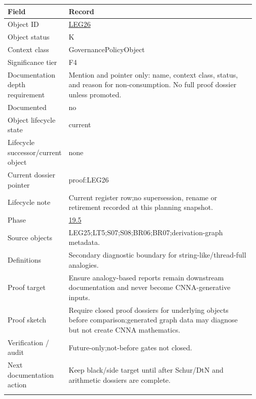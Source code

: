 \begin{longtable}{L{0.16\linewidth} L{0.81\linewidth}}
\hline
\textbf{Field} & \textbf{Record}\\
\hline
Object ID & \hyperlink{object-row-LEG26}{LEG26}\\
\hline\addlinespace[0.20em]
Object status & K\\
\hline\addlinespace[0.20em]
Context class & GovernancePolicyObject\\
\hline\addlinespace[0.20em]
Significance tier & F4\\
\hline\addlinespace[0.20em]
Documentation depth requirement & Mention and pointer only: name, context class, status, and reason for non-consumption. No full proof dossier unless promoted.\\
\hline\addlinespace[0.20em]
Documented & no\\
\hline\addlinespace[0.20em]
Object lifecycle state & current\\
\hline\addlinespace[0.20em]
Lifecycle successor/\allowbreak{}current object & none\\
\hline\addlinespace[0.20em]
Current dossier pointer & proof:LEG26\\
\hline\addlinespace[0.20em]
Lifecycle note & Current register row;\newline no supersession, rename or retirement recorded at this planning snapshot.\\
\hline\addlinespace[0.20em]
Phase & \hyperlink{phase-row-19-5}{19.5}\\
\hline\addlinespace[0.20em]
Source objects & LEG25;\newline LT5;\newline S07;\newline S08;\newline BR06;\newline BR07;\newline derivation-graph metadata.\\
\hline\addlinespace[0.20em]
Definitions & Secondary diagnostic boundary for string-like/\allowbreak{}thread-full analogies.\\
\hline\addlinespace[0.20em]
Proof target & Ensure analogy-based reports remain downstream documentation and never become CNNA-generative inputs.\\
\hline\addlinespace[0.20em]
Proof sketch & Require closed proof dossiers for underlying objects before comparison;\newline generated graph data may diagnose but not create CNNA mathematics.\\
\hline\addlinespace[0.20em]
Verification /\allowbreak{} audit & Future-only;\newline not-before gates not closed.\\
\hline\addlinespace[0.20em]
Next documentation action & Keep black/\allowbreak{}side target until after Schur/\allowbreak{}DtN and arithmetic dossiers are complete.\\
\hline\addlinespace[0.20em]
\end{longtable}

